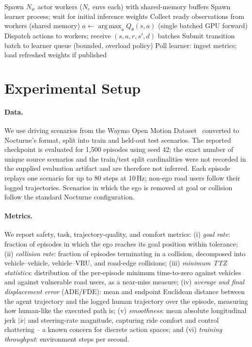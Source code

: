 \documentclass{article}
\DeclareMathOperator*{\argmax}{arg\,max}
\begin{document}
\begin{algorithm}[t]
\caption{Asynchronous training loop (main process)}
\label{alg:async}
\begin{algorithmic}[1]
\STATE Spawn $N_w$ actor workers ($N_e$ envs each) with shared-memory buffers
\STATE Spawn learner process; wait for initial inference weights
  \STATE Collect ready observations from workers (shared memory)
  \STATE $a \leftarrow \argmax_a Q_\theta(s, a)$ \hfill (single batched GPU forward)
  \STATE Dispatch actions to workers; receive $(s, a, r, s', d)$ batches
  \STATE Submit transition batch to learner queue (bounded, overload policy)
  \STATE Poll learner: ingest metrics; load refreshed weights if published
\ENDWHILE
\end{algorithmic}
\end{algorithm}

\section{Experimental Setup}
\label{sec:setup}

\paragraph{Data.}
We use driving scenarios from the Waymo Open Motion
Dataset~\citep{ettinger2021waymo} converted to Nocturne's format, split into
train and held-out test scenarios. The reported checkpoint is evaluated for
1{,}500 episodes using seed 42; the exact number of unique source scenarios
and the train/test split cardinalities were not recorded in the supplied
evaluation artifact and are therefore not inferred. Each episode replays one
scenario for up to 80 steps at 10\,Hz; non-ego road users follow their logged
trajectories. Scenarios in
which the ego is removed at goal or collision follow the standard Nocturne
configuration.

\paragraph{Metrics.}
We report safety, task, trajectory-quality, and comfort metrics:
(i) \emph{goal rate}: fraction of episodes in which the ego reaches its goal
position within tolerance; (ii) \emph{collision rate}: fraction of episodes
terminating in a collision, decomposed into vehicle--vehicle,
vehicle--VRU, and road-edge collisions; (iii) \emph{minimum TTZ statistics}:
distribution of the per-episode minimum time-to-zero against vehicles and
against vulnerable road users, as a near-miss measure; (iv) \emph{average
and final displacement error} (ADE/FDE): mean and endpoint Euclidean
distance between the agent trajectory and the logged human trajectory over
the episode, measuring how human-like the executed path is;
(v) \emph{smoothness}: mean absolute longitudinal jerk
$\overline{|\dddot{x}|}$ and steering-rate magnitude, capturing ride comfort
and control chattering -- a known concern for discrete action spaces; and
(vi) \emph{training throughput}: environment steps per second.
\end{document}

